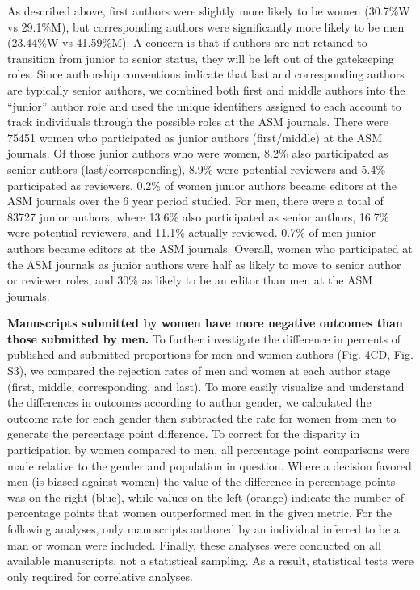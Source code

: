 \documentclass[11pt,]{article}
\begin{document}
As described above, first authors were slightly more likely to be women
(30.7\%W vs 29.1\%M), but corresponding authors were significantly more
likely to be men (23.44\%W vs 41.59\%M). A concern is that if authors
are not retained to transition from junior to senior status, they will
be left out of the gatekeeping roles. Since authorship conventions
indicate that last and corresponding authors are typically senior
authors, we combined both first and middle authors into the ``junior''
author role and used the unique identifiers assigned to each account to
track individuals through the possible roles at the ASM journals. There
were 75451 women who participated as junior authors (first/middle) at
the ASM journals. Of those junior authors who were women, 8.2\% also
participated as senior authors (last/corresponding), 8.9\% were
potential reviewers and 5.4\% participated as reviewers. 0.2\% of women
junior authors became editors at the ASM journals over the 6 year period
studied. For men, there were a total of 83727 junior authors, where
13.6\% also participated as senior authors, 16.7\% were potential
reviewers, and 11.1\% actually reviewed. 0.7\% of men junior authors
became editors at the ASM journals. Overall, women who participated at
the ASM journals as junior authors were half as likely to move to senior
author or reviewer roles, and 30\% as likely to be an editor than men at
the ASM journals.

\textbf{Manuscripts submitted by women have more negative outcomes than
those submitted by men.} To further investigate the difference in
percents of published and submitted proportions for men and women
authors (Fig. 4CD, Fig. S3), we compared the rejection rates of men and
women at each author stage (first, middle, corresponding, and last). To
more easily visualize and understand the differences in outcomes
according to author gender, we calculated the outcome rate for each
gender then subtracted the rate for women from men to generate the
percentage point difference. To correct for the disparity in
participation by women compared to men, all percentage point comparisons
were made relative to the gender and population in question. Where a
decision favored men (is biased against women) the value of the
difference in percentage points was on the right (blue), while values on
the left (orange) indicate the number of percentage points that women
outperformed men in the given metric. For the following analyses, only
manuscripts authored by an individual inferred to be a man or woman were
included. Finally, these analyses were conducted on all available
manuscripts, not a statistical sampling. As a result, statistical tests
were only required for correlative analyses.
\end{document}
